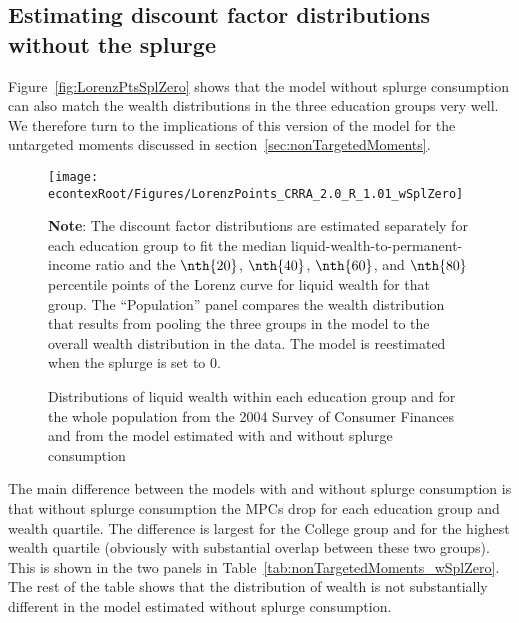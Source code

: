 \documentclass[\econtexRoot/HAFiscal-online-appendix]{subfiles}
\begin{document}
\subsection{Estimating discount factor distributions without the splurge}

Figure~\ref{fig:LorenzPtsSplZero} shows that the model without splurge consumption can also match the wealth distributions in the three education groups very well. We therefore turn to the implications of this version of the model for the untargeted moments discussed in section~\ref{sec:nonTargetedMoments}.


\begin{figure}[th]
	\begin{center}
		\texttt{[image: \\econtexRoot/Figures/LorenzPoints\_CRRA\_2.0\_R\_1.01\_wSplZero]}
		\caption{Distributions of liquid wealth within each education group and for the whole population from the 2004 Survey of Consumer Finances and from the model estimated with and without splurge consumption}
		\notinsubfile{\label{fig:LorenzPtsSplZero}}
		\parbox{16cm}{\small \vspace{.15cm} \textbf{Note}: The discount factor distributions are estimated separately for each education group to fit the median liquid-wealth-to-permanent-income ratio and the $\nth{20}$, $\nth{40}$, $\nth{60}$, and $\nth{80}$ percentile points of the Lorenz curve for liquid wealth for that group. The ``Population'' panel compares the wealth distribution that results from pooling the three groups in the model to the overall wealth distribution in the data. The model is reestimated when the splurge is set to $0$.\normalsize}
		
	\end{center}
\end{figure}

The main difference between the models with and without splurge consumption is that without splurge consumption the MPCs drop for each education group and wealth quartile.
The difference is largest for the College group and for the highest wealth quartile (obviously with substantial overlap between these two groups). This is shown in the two panels in Table~\ref{tab:nonTargetedMoments_wSplZero}. The rest of the table shows that the distribution of wealth is not substantially different in the model estimated without splurge consumption.
\end{document}
